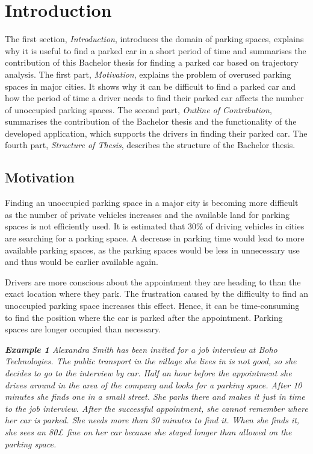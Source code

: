 \chapter{Introduction}

The first section, \textit{Introduction}, introduces the domain of parking spaces, explains why it is useful to find a parked car in a short period of time and summarises the contribution of this Bachelor thesis for finding a parked car based on trajectory analysis.
The first part, \textit{Motivation}, explains the problem of overused parking spaces in major cities. It shows why it can be difficult to find a parked car and how the period of time a driver needs to find their parked car affects the number of unoccupied parking spaces.
The second part, \textit{Outline of Contribution}, summarises the contribution of the Bachelor thesis and the functionality of the developed application, which supports the drivers in finding their parked car. 
The fourth part, \textit{Structure of Thesis}, describes the structure of the Bachelor thesis.

\section{Motivation}

Finding an unoccupied parking space in a major city is becoming more difficult as the number of private vehicles increases and the available land for parking spaces is not efficiently used. It is estimated that 30\% of driving vehicles in cities are searching for a parking space. A decrease in parking time would lead to more available parking spaces, as the parking spaces would be less in unnecessary use and thus would be earlier available again. \cite{wu2007robust} \cite{Ibrahim2018} \cite{Geng2012}

Drivers are more conscious about the appointment they are heading to than the exact location where they park. The frustration caused by the difficulty to find an unoccupied parking space increases this effect. Hence, it can be time-consuming to find the position where the car is parked after the appointment. Parking spaces are longer occupied than necessary.

\textit{\textbf{Example 1}
Alexandra Smith has been invited for a job interview at Boho Technologies. The public transport in the village she lives in is not good, so she decides to go to the interview by car. Half an hour before the appointment she drives around in the area of the company and looks for a parking space. After 10 minutes she finds one in a small street. She parks there and makes it just in time to the job interview. After the successful appointment, she cannot remember where her car is parked. She needs more than 30 minutes to find it. When she finds it, she sees an 80£ fine on her car because she stayed longer than allowed on the parking space.
}


